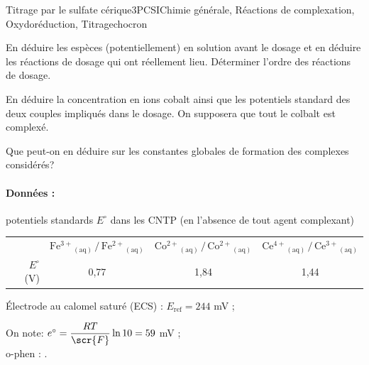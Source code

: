 \begin{exercise}{Titrage par le sulfate cérique}{3}{PCSI}{Chimie générale, Réactions de complexation, Oxydoréduction, Titrage}{chocron}
\begin{questions}
\question En déduire les espèces (potentiellement) en solution avant le dosage et en déduire les réactions de dosage qui ont réellement lieu. 
\question Déterminer l'ordre des réactions de dosage.

\question En déduire la concentration en ions cobalt ainsi que les potentiels standard des deux couples impliqués dans le dosage. On supposera que tout le colbalt est complexé.

\question Que peut-on en déduire sur les constantes globales de formation des complexes considérés?
\end{questions}

\paragraph{Données : } potentiels standards $E^\circ$ dans les CNTP (en l'absence de tout agent complexant)
\begin{center}\begin{tabular}{rccc}
    \hline
    & $\mathrm{{Fe^{3+}}_{(aq)} \,/\, {Fe^{2+}}_{(aq)}}$ & $\mathrm{{Co^{2+}}_{(aq)} \,/\, {Co^{2+}}_{(aq)}}$ & $\mathrm{{Ce^{4+}}_{(aq)} \,/\, {Ce^{3+}}_{(aq)}}$ \\
    $E^\circ$ (V) & 0,77 & 1,84 & 1,44 \\ \hline\hline 
\end{tabular}\end{center}

\'Electrode au calomel saturé (ECS) : $E_\text{ref} = 244$ mV ;

On note: $e^\circ = \dfrac{RT}{\scr{F}} \ln10 = 59$ mV ; \\[-.2em]

o-phen : {}.

\end{exercise}


